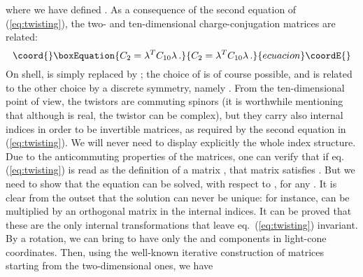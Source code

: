 \documentclass[a4paper,12pt]{article}
\begin{document}
where we have defined \coordHE{}. As 
a consequence of the second equation of (\ref{eq:twisting}), the two- 
and ten-dimensional charge-conjugation matrices are related:
\begin{equation}\coord{}\boxEquation{
  C_2 = \lambda^T C_{10} \lambda \, .
}{
  C_2 = \lambda^T C_{10} \lambda \, .
}{ecuacion}\coordE{}\end{equation}
On shell, \coordHE{} is simply replaced by \myHighlight{$\sigma_-$}\coordHE{}; the choice of
\myHighlight{$\sigma_+$}\coordHE{} is of course possible, and is related to the other choice
by a discrete symmetry, namely \coordHE{}.  From the
ten-dimensional point of view, the twistors \myHighlight{$\lambda$}\coordHE{} are commuting
spinors (it is worthwhile mentioning that although \coordHE{} is
real, the twistor can be complex), but they carry also internal
indices \coordHE{} in order to be
invertible matrices, as required by the second equation in
(\ref{eq:twisting}). We will never
need to display explicitly the whole index structure. \\
%
Due to the anticommuting properties of the \myHighlight{$\sigma$}\coordHE{} matrices, one can
verify that if eq.~ (\ref{eq:twisting}) is read as the definition
of a matrix \coordHE{}, that matrix satisfies \coordHE{}.  But we
need to show that the equation can be solved, with respect to
\myHighlight{$\lambda$}\coordHE{}, for any \coordHE{}. It is clear from the outset that the solution
can never be unique: for instance, \myHighlight{$\lambda$}\coordHE{} can be multiplied by an
orthogonal matrix \coordHE{} in the internal indices. It can be proved
that these are the only internal transformations that leave
eq.~(\ref{eq:twisting}) invariant. By a rotation,
we can bring \coordHE{} to have only the \coordHE{} and \coordHE{} components in
light-cone coordinates.  Then, using the well-known iterative
construction of \myHighlight{$\Gamma$}\coordHE{} matrices starting from the two-dimensional
ones, we have
\end{document}
